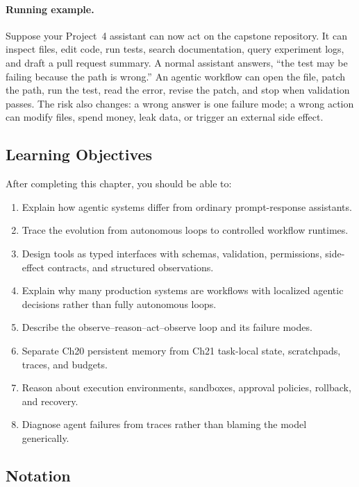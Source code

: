 \paragraph{Running example.} Suppose your Project~4 assistant can now act on the capstone repository. It can inspect files, edit code, run tests, search documentation, query experiment logs, and draft a pull request summary. A normal assistant answers, ``the test may be failing because the path is wrong.'' An agentic workflow can open the file, patch the path, run the test, read the error, revise the patch, and stop when validation passes. The risk also changes: a wrong answer is one failure mode; a wrong action can modify files, spend money, leak data, or trigger an external side effect.

\subsection*{Learning Objectives}

After completing this chapter, you should be able to:

\begin{enumerate}
  \item Explain how agentic systems differ from ordinary prompt-response assistants.
  \item Trace the evolution from autonomous loops to controlled workflow runtimes.
  \item Design tools as typed interfaces with schemas, validation, permissions, side-effect contracts, and structured observations.
  \item Explain why many production systems are workflows with localized agentic decisions rather than fully autonomous loops.
  \item Describe the observe--reason--act--observe loop and its failure modes.
  \item Separate Ch20 persistent memory from Ch21 task-local state, scratchpads, traces, and budgets.
  \item Reason about execution environments, sandboxes, approval policies, rollback, and recovery.
  \item Diagnose agent failures from traces rather than blaming the model generically.
\end{enumerate}

\subsection*{Notation}

